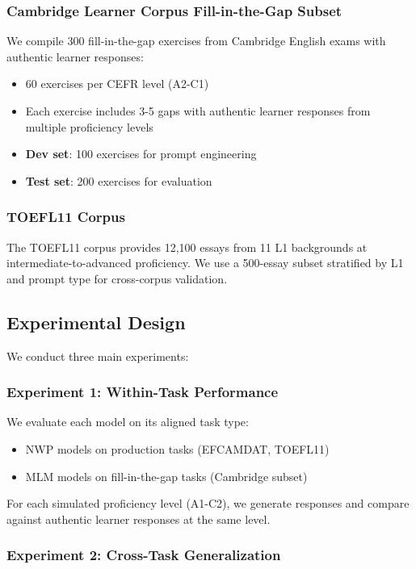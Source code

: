 \subsubsection{Cambridge Learner Corpus Fill-in-the-Gap Subset}

We compile 300 fill-in-the-gap exercises from Cambridge English exams with authentic learner responses:
\begin{itemize}
    \item 60 exercises per CEFR level (A2-C1)
    \item Each exercise includes 3-5 gaps with authentic learner responses from multiple proficiency levels
    \item \textbf{Dev set}: 100 exercises for prompt engineering
    \item \textbf{Test set}: 200 exercises for evaluation
\end{itemize}

\subsubsection{TOEFL11 Corpus}

The TOEFL11 corpus \cite{blanchard2013toefl11} provides 12,100 essays from 11 L1 backgrounds at intermediate-to-advanced proficiency. We use a 500-essay subset stratified by L1 and prompt type for cross-corpus validation.

\subsection{Experimental Design}

We conduct three main experiments:

\subsubsection{Experiment 1: Within-Task Performance}

We evaluate each model on its aligned task type:
\begin{itemize}
    \item NWP models on production tasks (EFCAMDAT, TOEFL11)
    \item MLM models on fill-in-the-gap tasks (Cambridge subset)
\end{itemize}

For each simulated proficiency level (A1-C2), we generate responses and compare against authentic learner responses at the same level.

\subsubsection{Experiment 2: Cross-Task Generalization}

